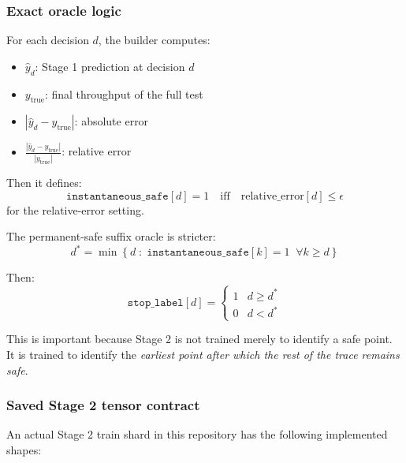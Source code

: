 \documentclass[11pt]{article}
\begin{document}
\subsubsection*{Exact oracle logic}

For each decision \(d\), the builder computes:
\begin{itemize}
\item \(\hat{y}_d\): Stage 1 prediction at decision \(d\)
\item \(y_{\text{true}}\): final throughput of the full test
\item \(|\hat{y}_d - y_{\text{true}}|\): absolute error
\item \(\frac{|\hat{y}_d - y_{\text{true}}|}{|y_{\text{true}}|}\): relative error
\end{itemize}

Then it defines:
\[
\texttt{instantaneous\_safe}[d] = 1
\quad \text{iff} \quad
\text{relative\_error}[d] \le \epsilon
\]
for the relative-error setting.

The permanent-safe suffix oracle is stricter:
\[
d^{*} = \min \left\{ d \;:\; \texttt{instantaneous\_safe}[k] = 1 \;\; \forall k \ge d \right\}
\]

Then:
\[
\texttt{stop\_label}[d] =
\begin{cases}
1 & d \ge d^{*} \\
0 & d < d^{*}
\end{cases}
\]

This is important because Stage 2 is not trained merely to identify a safe point. It is trained to identify the \emph{earliest point after which the rest of the trace remains safe}.

\subsubsection*{Saved Stage 2 tensor contract}

An actual Stage 2 train shard in this repository has the following implemented shapes:
\end{document}
